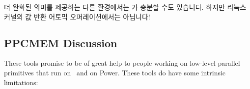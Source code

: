{{	더 완화된 의미를 제공하는 다른 환경에서는  가 충분할 수도
	있습니다.
	하지만 리눅스 커널의 값 반환 어토믹 오퍼레이션에서는 아닙니다!

	\iffalse

	It depends on the semantics required.
	The rest of this answer assumes that the assembly language
	for \co{P0} in
	\cref{lst:formal:PPCMEM Litmus Test}
	is supposed to implement a value-returning atomic operation.

	As is discussed in
	\cref{chp:Advanced Synchronization: Memory Ordering},
	Linux kernel's memory consistency model requires
	value-returning atomic RMW operations to be fully ordered
	on both sides.
	The ordering provided by \co{lwsync} is insufficient for this
	purpose, and so \co{sync} should be used instead.
	This change has since been
	made~\cite{BoqunFeng2015:powerpc:value-returning-atomics}
	in response to an email thread discussing a couple of other litmus
	tests~\cite{Paulmck2015:powerpc:value-returning-atomics}.
	Finding any other bugs that the Linux kernel might have is left
	as an exercise for the reader.

	In other enviroments providing weaker semantics, \co{lwsync}
	might be sufficient.
	But not for the Linux kernel's value-returning atomic operations!

	\fi

}\QuickQuizEndE
}

\subsection{PPCMEM Discussion}
\label{sec:formal:PPCMEM Discussion}

These tools promise to be of great help to people working on low-level
parallel primitives that run on \ARM\ and on Power. These tools do have
some intrinsic limitations:

